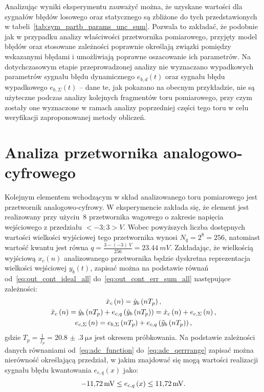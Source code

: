 Analizując wyniki eksperymentu zauważyć można, że uzyskane wartości dla sygnałów błędów losowego oraz statycznego są zbliżone do tych przedstawionych w tabeli~\ref{tab:sym_partb_params_unc_sum}. Pozwala to zakładać, że podobnie jak w przypadku analizy właściwości przetwornika pomiarowego, przyjęty model błędów oraz stosowane zależności poprawnie określają związki pomiędzy wskazanymi błędami i umożliwiają poprawne oszacowanie ich parametrów. Na dotychczasowym etapie przeprowadzonej analizy nie wyznaczano wypadkowych parametrów sygnału błędu dynamicznego $e_{b,d}(t)$ oraz sygnału błędu wypadkowego $e_{b,\Sigma}(t)$ -- dane te, jak pokazano na obecnym przykładzie, nie są użyteczne podczas analizy kolejnych fragmentów toru pomiarowego, przy czym zostały one wyznaczone w ramach analizy poprzedniej części tego toru w celu weryfikacji zaproponowanej metody obliczeń.

\section{Analiza przetwornika analogowo-cyfrowego}

Kolejnym elementem wchodzącym w skład analizowanego toru pomiarowego jest przetwornik analogowo-cyfrowy. W eksperymencie zakłada się, że element jest realizowany przy użyciu~\qty{8}{\bitOwego} przetwornika wagowego o zakresie napięcia wejściowego z przedziału $<-3;3>\unit{V}$. Wobec powyższych liczba dostępnych wartości wielkości wyjściowej tego przetwornika wynosi $N_{q} = 2^{8} = 256$, natomiast wartość kwantu jest równa $q = \frac{3 - (-3)~\unit{V}}{256} = \qty{23.44}{mV}$. Zakładając, że wielkością wyjściową $x_{c}(n)$ analizowanego przetwornika będzie dyskretna reprezentacja wielkości wejściowej $y_{b}(t)$, zapisać można na podstawie równań od~\eqref{eq:out_cont_ideal_all} do~\eqref{eq:out_cont_err_sum_all} następujące zależności:
\begin{gather}
\dot{x}_{c} \left(n\right) = \dot{y}_{b} \left(nT_{p}\right) \label{eq:sym_partc_out_ideal}, \\
\tilde{x}_{c} \left(n\right) = \tilde{y}_{b} \left(nT_{p}\right) + e_{c,q} \left( \tilde{y}_{b} \left(nT_{p}\right) \right) = \dot{x}_{c} \left(n\right) + e_{c,\Sigma} \left(n\right) \label{eq:sym_partc_out_real}, \\
e_{c,\Sigma} \left(n\right) = e_{b,\Sigma} \left(nT_{p}\right) + e_{c,q} \left( \tilde{y}_{b} \left(nT_{p}\right) \right) \label{eq:sym_partc_error_sum},
\end{gather}
gdzie $T_{p} = \frac{1}{f_{p}} = \qty{20.8(3)}{\micro s}$ jest okresem próbkowania. Na podstawie zależności danych równaniami od~\eqref{eq:adc_function} do~\eqref{eq:adc_qerrrange} zapisać można nierówność określającą przedział, w jakim znajdować się mogą wartości realizacji sygnału błędu kwantowania $e_{c,q}(x)$ jako:
\begin{equation}
\qty{-11.72}{mV} \le e_{c,q} \left(x\right) \le \qty{11.72}{mV} \label{eq:sym_partc_error_quant}.
\end{equation}

